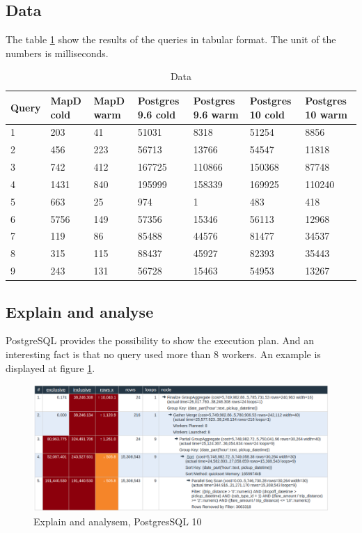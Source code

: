 \subsection{Data}
The table \ref{tab:data} show the results of the queries in tabular format. The unit of the numbers is milliseconds.
\begin{table}[H]
\centering
\begin{tabular}{|p{1.2cm}|p{2cm}|p{2cm}|p{2cm}|p{2cm}|p{2cm}|p{2cm}|}
\hline
Query & MapD cold & MapD warm & Postgres 9.6 cold & Postgres 9.6 warm & Postgres 10 cold & Postgres 10 warm \\
\hline
1 & 203 & 41 & 51031 & 8318 & 51254 & 8856 \\
2 & 456 & 223 & 56713 & 13766 & 54547 & 11818 \\
3 & 742 & 412 & 167725 & 110866 & 150368 & 87748 \\
4 & 1431 & 840 & 195999 & 158339 & 169925 & 110240 \\
5 & 663 & 25 & 974 & 1 & 483 & 418 \\
6 & 5756 & 149 & 57356 & 15346 & 56113 & 12968 \\
7 & 119 & 86 & 85488 & 44576 & 81477 & 34537 \\
8 & 315 & 115 & 88437 & 45927 & 82393 & 35443 \\
9 & 243 & 131 & 56728 & 15463 & 54953 & 13267 \\
\hline
\end{tabular}
\caption{Data}
\label{tab:data}
\end{table}

\subsection{Explain and analyse}
PostgreSQL provides the possibility to show the execution plan.
And an interesting fact is that no query used more than 8 workers.
An example is displayed at figure \ref{fig:explain}.

\begin{figure}[H]
    \centering
    \includegraphics[width=1\textwidth,keepaspectratio]{images/explain_p10_q7.png}
    \caption{Explain and analysem, PostgresSQL 10}
    \label{fig:explain}
\end{figure}

